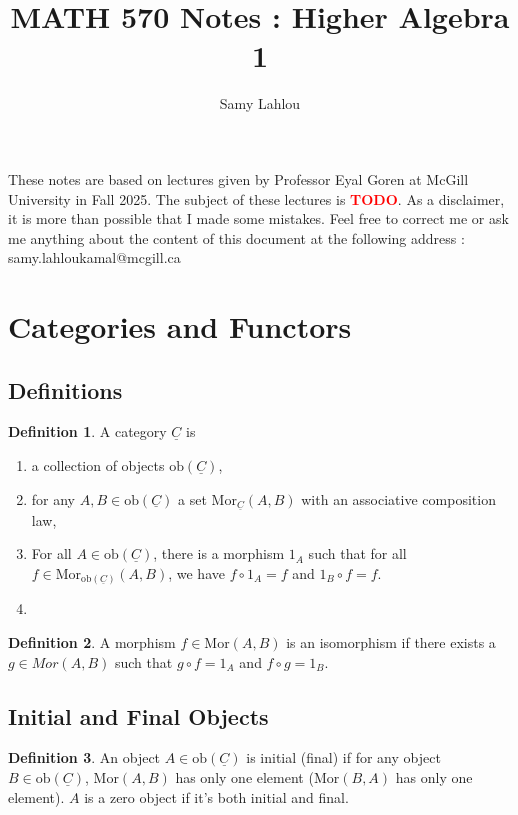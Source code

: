 \documentclass{article}
\title{MATH 570 Notes : Higher Algebra 1}
\author{Samy Lahlou}
\date{}
\theoremstyle{plain}
\theoremstyle{definition}
\newtheorem*{definition}{Definition}
\newcommand{\td}{\textcolor{red}{\textbf{TODO}}}
\begin{document}
\maketitle

These notes are based on lectures given by Professor Eyal Goren at McGill University in Fall 2025. The subject of these lectures is \td. As a disclaimer, it is more than possible that I made some mistakes. Feel free to correct me or ask me anything about the content of this document at the following address : samy.lahloukamal@mcgill.ca

\tableofcontents

\newpage

\section{Categories and Functors}

\subsection{Definitions}

\begin{definition}
    A category $\underline{C}$ is
    \begin{enumerate}
        \item a collection of objects $\text{ob}(\underline{C})$,
        \item for any $A,B \in \text{ob}(\underline{C})$ a set $\text{Mor}_{\underline{C}}(A,B)$ with an associative composition law,
        \item For all $A \in \text{ob}(\underline{C})$, there is a morphism $1_A$ such that for all $f \in \text{Mor}_{\text{ob}(\underline{C})}(A,B)$, we have $f \circ 1_A = f$ and $1_B \circ f = f$.
        \item 
    \end{enumerate}
\end{definition}

\begin{definition}
    A morphism $f \in \text{Mor}(A,B)$ is an isomorphism if there exists a $g \in \textit{Mor}(A,B)$ such that $g \circ f = 1_A$ and $f \circ g = 1_B$.
\end{definition}

\subsection{Initial and Final Objects}

\begin{definition}
    An object $A \in \text{ob}(\underline{C})$ is initial (final) if for any object $B \in \text{ob}(\underline{C})$, $\text{Mor}(A,B)$ has only one element ($\text{Mor}(B,A)$ has only one element). $A$ is a zero object if it's both initial and final.
\end{definition}
\end{document}
